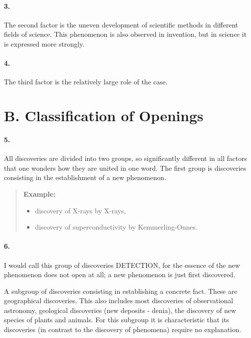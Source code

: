 \documentclass[11pt,a4paper]{article}
\newenvironment{example}{\begin{quote} \textbf{Example:}\par }{\end{quote}}
\begin{document}
\paragraph{3.}
The second factor is the uneven development of scientific methods in different
fields of science.  This phenomenon is also observed in invention, but in
science it is expressed more strongly.

\paragraph{4.}
The third factor is the relatively large role of the case.

\section*{B. Classification of Openings}

\paragraph{5.}
All discoveries are divided into two groups, so significantly different in all
factors that one wonders how they are united in one word.  The first group is
discoveries consisting in the establishment of a new phenomenon.

\begin{example}
  \begin{itemize}
  \item discovery of X-rays by X-rays,
  \item discovery of superconductivity by Kemmerling-Onnes.
  \end{itemize}
\end{example}

\paragraph{6.}
I would call this group of discoveries DETECTION, for the essence of the new
phenomenon does not open at all; a new phenomenon is just first discovered.

A subgroup of discoveries consisting in establishing a concrete fact. These
are geographical discoveries. This also includes most discoveries of
observational astronomy, geological discoveries (new deposits - denia), the
discovery of new species of plants and animals. For this subgroup it is
characteristic that its discoveries (in contrast to the discovery of
phenomena) require no explanation.
\end{document}
